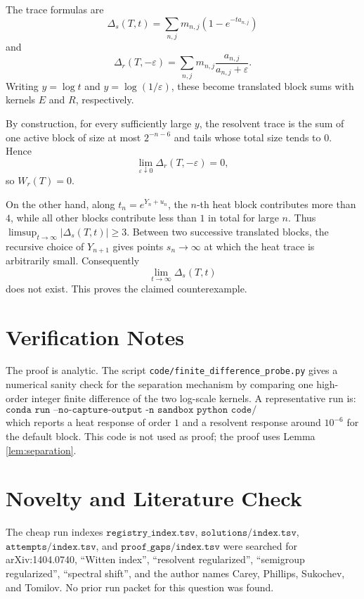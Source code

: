 \documentclass[11pt]{article}
\newcommand{\eps}{\varepsilon}
\begin{document}
The trace formulas are
\[
  \Delta_s(T,t)=\sum_{n,j}m_{n,j}\left(1-e^{-ta_{n,j}}\right)
\]
and
\[
  \Delta_r(T,-\eps)=\sum_{n,j}m_{n,j}\frac{a_{n,j}}{a_{n,j}+\eps}.
\]
Writing \(y=\log t\) and \(y=\log(1/\eps)\), these become translated block sums
with kernels \(E\) and \(R\), respectively.

By construction, for every sufficiently large \(y\), the resolvent trace is the
sum of one active block of size at most \(2^{-n-6}\) and tails whose total size
tends to \(0\).  Hence
\[
  \lim_{\eps\downarrow0}\Delta_r(T,-\eps)=0,
\]
so \(W_r(T)=0\).

On the other hand, along \(t_n=e^{Y_n+u_n}\), the \(n\)-th heat block contributes
more than \(4\), while all other blocks contribute less than \(1\) in total for
large \(n\).  Thus \(\limsup_{t\to\infty}|\Delta_s(T,t)|\geq3\).  Between two
successive translated blocks, the recursive choice of \(Y_{n+1}\) gives points
\(s_n\to\infty\) at which the heat trace is arbitrarily small.  Consequently
\[
  \lim_{t\to\infty}\Delta_s(T,t)
\]
does not exist.  This proves the claimed counterexample.

\section*{Verification Notes}

The proof is analytic.  The script
\texttt{code/finite\_difference\_probe.py} gives a numerical sanity check for
the separation mechanism by comparing one high-order integer finite difference
of the two log-scale kernels.  A representative run is:
\[
\texttt{conda run --no-capture-output -n sandbox python code/finite\_difference\_probe.py}
\]
which reports a heat response of order \(1\) and a resolvent response around
\(10^{-6}\) for the default block.  This code is not used as proof; the proof
uses Lemma \ref{lem:separation}.

\section*{Novelty and Literature Check}

The cheap run indexes
\(\texttt{registry\_index.tsv}\), \(\texttt{solutions/index.tsv}\),
\(\texttt{attempts/index.tsv}\), and \(\texttt{proof\_gaps/index.tsv}\) were
searched for arXiv:1404.0740, ``Witten index'', ``resolvent regularized'',
``semigroup regularized'', ``spectral shift'', and the author names Carey,
Phillips, Sukochev, and Tomilov.  No prior run packet for this question was
found.
\end{document}
